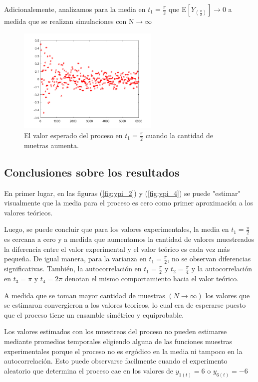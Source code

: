 Adicionalemente, analizamos para la media en $t_1 = \frac{\pi}{2}$ que E$\left[ Y_{(\frac{\pi}{2})}\right]\rightarrow 0$ a medida que se realizan simulaciones con N$\rightarrow \infty$
\begin{figure}[H]
\centering
	\includegraphics[width=0.6\textwidth, trim = {0 0 0 0},clip]{./ImagenesEjercicio1/media.png}
	\caption{El valor esperado del proceso en $t_1 = \frac{\pi}{2}$ cuando la cantidad de muetras aumenta.}
	\label{fig:media}
\end{figure}

\subsection{Conclusiones sobre los resultados}

En primer lugar, en las figuras (\ref{fig:ypi_2}) y (\ref{fig:ypi_4}) se puede "estimar" visualmente que la media para el proceso es cero como primer aproximación a los valores teóricos.

Luego, se puede concluir que para los valores experimentales, la media en $t_1 = \frac{\pi}{2}$ es cercana a cero y a medida que aumentamos la cantidad de valores muestreados la diferencia entre el valor experimental y el valor teórico es cada vez más pequeña. De igual manera, para la varianza en $t_1 = \frac{\pi}{2}$, no se observan diferencias significativas.
También, la autocorrelación en $t_1 = \frac{\pi}{2}$ y $t_2 = \frac{\pi}{4}$ y la autocorrelación en $t_3 = \pi$ y $t_4 = 2\pi$ denotan el mismo comportamiento hacia el valor teórico. 

A medida que se toman mayor cantidad de muestras $(N \rightarrow \infty )$ los valores que se estimaron convergieron a los valores teoricos, lo cual era de esperarse puesto que el proceso tiene un ensamble simétrico y equiprobable. 

Los valores estimados con los muestreos del proceso no pueden estimarse mediante promedios temporales eligiendo alguna de las funciones muestras experimentales porque el proceso no es ergódico en la media ni tampoco en la autocorrelación. Esto puede observarse facilmente cuando el experimento aleatorio que determina el proceso cae en los valores de $y_{1(t)} = 6$ o $y_{6(t)} = -6$ 





